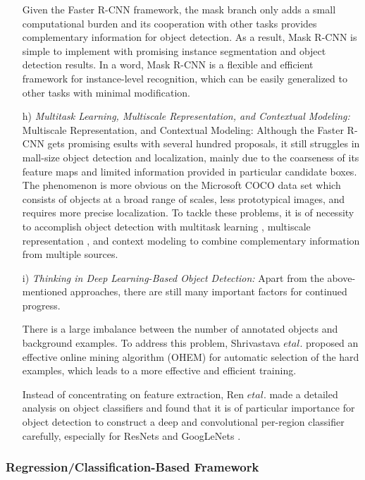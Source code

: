\documentclass[two column]{ieeeaccess}
\begin{document}
\begin{itemize}
    Given the Faster R-CNN framework, the mask branch only adds a small computational burden and its cooperation with other tasks provides complementary information for object detection. As a result, Mask R-CNN is simple to implement with promising instance segmentation and object detection results. In a word, Mask R-CNN is a flexible and efficient framework for instance-level recognition, which can be easily generalized to other tasks with minimal modification. \\
    
    \item[h)]\textit{Multitask Learning, Multiscale Representation, and Contextual Modeling: } Multiscale Representation, and Contextual Modeling: Although the Faster R-CNN gets promising esults with several hundred proposals, it still struggles in mall-size object detection and localization, mainly due to the coarseness of its feature maps and limited information provided in particular candidate boxes. The phenomenon is more obvious on the Microsoft COCO data set which consists of objects at a broad range of scales, less prototypical images, and requires more precise localization. To tackle these problems, it is of necessity to accomplish object detection with multitask learning \cite{100}, multiscale representation \cite{95}, and context modeling \cite{101} to combine complementary information from multiple sources. \\
    
    \item[i)]\textit{Thinking in Deep Learning-Based Object Detection: } Apart from the above-mentioned approaches, there are still many important factors for continued progress. 
    
    There is a large imbalance between the number of annotated objects and background examples. To address this problem, Shrivastava $et al$. \cite{113} proposed an effective online mining algorithm (OHEM) for automatic selection of the hard examples, which leads to a more effective and efficient training. 
    
    Instead of concentrating on feature extraction, Ren $et al$. \cite{114} made a detailed analysis on object classifiers and found that it is of particular importance for object detection to construct a deep and convolutional per-region classifier carefully, especially for ResNets \cite{47} and GoogLeNets \cite{45}.
    
\end{itemize}

\subsubsection{Regression/Classification-Based Framework}
\end{document}
